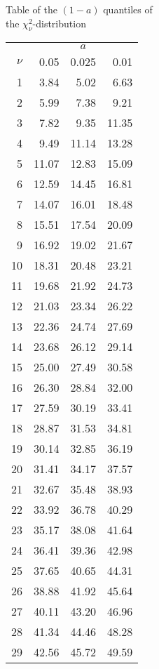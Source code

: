 \documentclass{article}
\begin{document}
	\begin{minipage}[t]{6cm}
		Table of the $(1-a)$ quantiles of\\ the $\chi^2_{\nu }$-distribution
		
		\begin{center}
			\begin{tabular}{|r|rrr|}
				\hline
				& \multicolumn{3}{|c|}{$a$} \\ 
				$\nu$ & 0.05 & 0.025 & 0.01 \\ \hline
				1 & 3.84 & 5.02 & 6.63 \\
				2 & 5.99 & 7.38 & 9.21 \\
				3 & 7.82 & 9.35 & 11.35 \\
				4 & 9.49 & 11.14 & 13.28 \\
				5 & 11.07 & 12.83 & 15.09 \\
				6 & 12.59 & 14.45 & 16.81 \\
				7 & 14.07 & 16.01 & 18.48 \\
				8 & 15.51 & 17.54 & 20.09 \\
				9 & 16.92 & 19.02 & 21.67 \\
				10 & 18.31 & 20.48 & 23.21 \\
				11 & 19.68 & 21.92 & 24.73 \\
				12 & 21.03 & 23.34 & 26.22 \\
				13 & 22.36 & 24.74 & 27.69 \\
				14 & 23.68 & 26.12 & 29.14 \\
				15 & 25.00 & 27.49 & 30.58 \\
				16 & 26.30 & 28.84 & 32.00 \\
				17 & 27.59 & 30.19 & 33.41 \\
				18 & 28.87 & 31.53 & 34.81 \\
				19 & 30.14 & 32.85 & 36.19 \\
				20 & 31.41 & 34.17 & 37.57 \\
				21 & 32.67 & 35.48 & 38.93 \\
				22 & 33.92 & 36.78 & 40.29 \\
				23 & 35.17 & 38.08 & 41.64 \\
				24 & 36.41 & 39.36 & 42.98 \\
				25 & 37.65 & 40.65 & 44.31 \\
				26 & 38.88 & 41.92 & 45.64 \\
				27 & 40.11 & 43.20 & 46.96 \\
				28 & 41.34 & 44.46 & 48.28 \\
				29 & 42.56 & 45.72 & 49.59 \\

\end{tabular}
\end{center}
\end{minipage}
\end{document}
